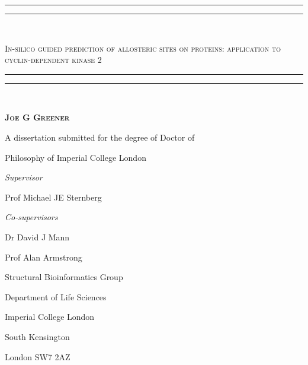 \documentclass[12pt]{report}
\begin{document}
\onehalfspacing

\begin{titlepage}
\thispagestyle{plain}
\centering
\singlespacing
\settowidth{\unitlength}{\LARGE xxxxxxxxxxxxxxxxxxxxxxxxxxxxxxxxxx}
\rule{\unitlength}{1.6pt}\vspace*{-\baselineskip}\vspace*{2pt}
\rule{\unitlength}{0.4pt}\\[\baselineskip]
{\scshape\LARGE In-silico guided prediction of allosteric sites on proteins: application to cyclin-dependent kinase 2\par}
\rule{\unitlength}{0.4pt}\vspace*{-\baselineskip}\vspace{3.2pt}
\rule{\unitlength}{1.6pt}\\[\baselineskip]
\vspace{1.0cm}
{\scshape\Large \textbf{Joe G Greener}\par}
\vspace{1.0cm}
{\large A dissertation submitted for the degree of Doctor of\par}
{\large Philosophy of Imperial College London\par}
\vspace{1.0cm}

\onehalfspacing
\begin{minipage}[t]{7cm}
\flushleft
{\large \textit{Supervisor}\par}
{\large Prof Michael JE Sternberg\par}
\end{minipage}
\hfill
\begin{minipage}[t]{7cm}
\flushright
{\large \textit{Co-supervisors}\par}
{\large Dr David J Mann\par}
{\large Prof Alan Armstrong\par}
\end{minipage}

\vspace{1.0cm}
{\large Structural Bioinformatics Group\par}
{\large Department of Life Sciences\par}
{\large Imperial College London\par}
{\large South Kensington\par}
{\large London SW7 2AZ\par}
\end{titlepage}


\end{document}
